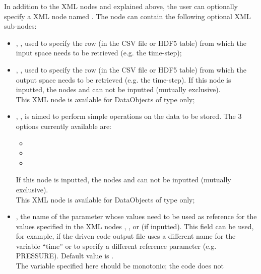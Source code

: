 In addition to the XML nodes  and  explained above, the user
can optionally specify a XML node named  . The   node can
contain the following optional XML sub-nodes:

\begin{itemize}
  \item {}, , used to
       specify  the row (in the CSV file or HDF5 table) from which the input space
      needs to be retrieved (e.g. the time-step);
  \item {}, , used to
       specify  the row (in the CSV file or HDF5 table) from which the output space
      needs to be retrieved (e.g. the time-step). If this node is inputted, the nodes
        and   can not be inputted (mutually exclusive).
     \\\nb This XML node is available for DataObjects of type  only;
  \item {}, , is aimed to perform
       simple operations on the data to be stored.
       The 3 options currently available are:
       \begin{itemize}
          \item {}
          \item {}
          \item {}
       \end{itemize}
       If this node is inputted, the nodes
        and   can not be inputted (mutually exclusive).
       \\\nb This XML node is available for DataObjects of type  only;
  \item {},  the name of
    the parameter whose values need to be used as reference for the values
    specified in the XML nodes ,
    , or  (if inputted).
    This field can be used, for example, if the driven code output file uses  a
    different name for the variable ``time'' or to specify a different reference
    parameter (e.g. PRESSURE). Default value is .
    \\\nb The variable specified here should be monotonic; the code does not

\end{itemize}
